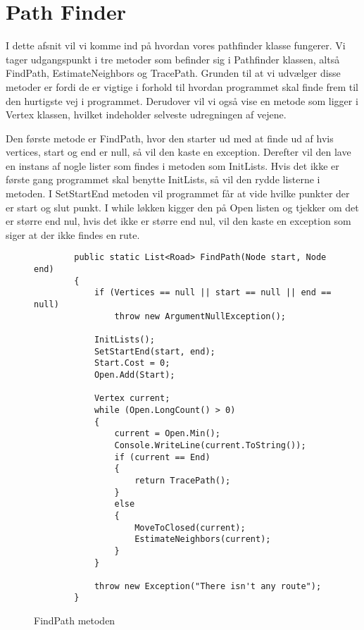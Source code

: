 \chapter{Path Finder}\label{PathFinder}
I dette afsnit vil vi komme ind på hvordan vores pathfinder klasse fungerer. Vi tager udgangspunkt i tre metoder som befinder sig i Pathfinder klassen, altså FindPath, EstimateNeighbors og TracePath. Grunden til at vi udvælger disse metoder er fordi de er vigtige i forhold til hvordan programmet skal finde frem til den hurtigste vej i programmet. Derudover vil vi også vise en metode som ligger i Vertex klassen, hvilket indeholder selveste udregningen af vejene. 

\vspace{5mm}

Den første metode er FindPath, hvor den starter ud med at finde ud af hvis vertices, start og end er null, så vil den kaste en exception. Derefter vil den lave en instans af nogle lister som findes i metoden som InitLists. Hvis det ikke er første gang programmet skal benytte InitLists, så vil den rydde listerne i metoden. I SetStartEnd metoden vil programmet får at vide hvilke punkter der er start og slut punkt. I while løkken kigger den på Open listen og tjekker om det er større end nul, hvis det ikke er større end nul, vil den kaste en exception som siger at der ikke findes en rute.

\begin{figure}[H]
\begin{lstlisting}
		public static List<Road> FindPath(Node start, Node end)
        {
            if (Vertices == null || start == null || end == null)
                throw new ArgumentNullException();

            InitLists();
            SetStartEnd(start, end);
            Start.Cost = 0;
            Open.Add(Start);

            Vertex current;
            while (Open.LongCount() > 0)
            {
                current = Open.Min();
                Console.WriteLine(current.ToString());
                if (current == End)
                {
                    return TracePath();
                } 
                else
                {
                    MoveToClosed(current);
                    EstimateNeighbors(current);
                }
            }

            throw new Exception("There isn't any route");
        }
\end{lstlisting}
\caption{FindPath metoden}\label{FindPathCode}
\end{figure}

